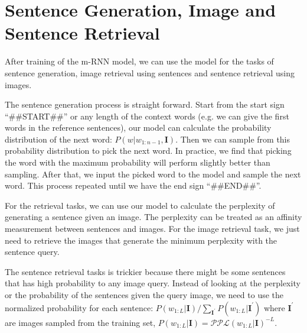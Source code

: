 \section{Sentence Generation, Image and Sentence Retrieval}
After training of the m-RNN model, we can use the model for the tasks of sentence generation, image retrieval using sentences and sentence retrieval using images.

The sentence generation process is straight forward.
Start from the start sign ``\#\#START\#\#'' or any length of the context words (e.g. we can give the first words in the reference sentences), our model can calculate the probability distribution of the next word: $P(w|w_{1:n-1},\mathbf{I})$.
Then we can sample from this probability distribution to pick the next word.
In practice, we find that picking the word with the maximum probability will perform slightly better than sampling.
After that, we input the picked word to the model and sample the next word.
This process repeated until we have the end sign ``\#\#END\#\#''.

For the retrieval tasks, we can use our model to calculate the perplexity of generating a sentence given an image.
The perplexity can be treated as an affinity measurement between sentences and images.
For the image retrieval task, we just need to retrieve the images that generate the minimum perplexity with the sentence query. 

The sentence retrieval tasks is trickier because there might be some sentences that has high probability to any image query.
Instead of looking at the perplexity or the probability of the sentences given the query image, we need to use the normalized probability for each sentence: $P(w_{1:L}|\mathbf{I}) / \sum_{\mathbf{I^{'}}} P(w_{1:L}|\mathbf{I^{'}})$ where $\mathbf{I^{'}}$ are images sampled from the training set, $P(w_{1:L}|\mathbf{I}) = \mathcal{PPL}(w_{1:L}|\mathbf{I}) ^ {-L}$.
